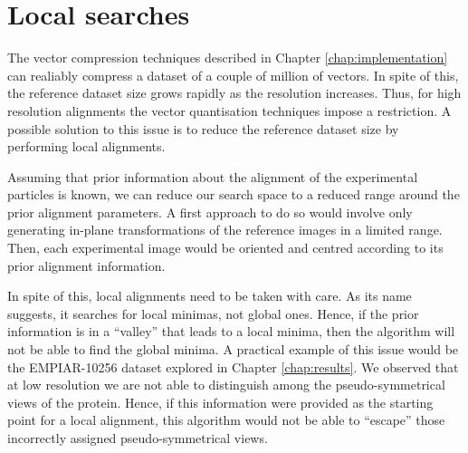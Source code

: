 \documentclass[../main.tex]{subfiles}
\begin{document}
\section{Local searches}
The vector compression techniques described in Chapter \ref{chap:implementation} can realiably compress a dataset of a couple of million of vectors. In spite of this, the reference dataset size grows rapidly as the resolution increases. Thus, for high resolution alignments the vector quantisation techniques impose a restriction. A possible solution to this issue is to reduce the reference dataset size by performing local alignments.

Assuming that prior information about the alignment of the experimental particles is known, we can reduce our search space to a reduced range around the prior alignment parameters. A first approach to do so would involve only generating in-plane transformations of the reference images in a limited range. Then, each experimental image would be oriented and centred according to its prior alignment information. 

In spite of this, local alignments need to be taken with care. As its name suggests, it searches for local minimas, not global ones. Hence, if the prior information is in a ``valley'' that leads to a local minima, then the algorithm will not be able to find the global minima. A practical example of this issue would be the EMPIAR-10256 dataset explored in Chapter \ref{chap:results}. We observed that at low resolution we are not able to distinguish among the pseudo-symmetrical views of the protein. Hence, if this information were provided as the starting point for a local alignment, this algorithm would not be able to ``escape'' those incorrectly assigned pseudo-symmetrical views.
\end{document}
